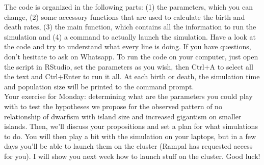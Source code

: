 \documentclass[12pt]{article}
\begin{document}
The code is organized in the following parts: (1) the parameters, which you can change, (2) some accessory functions that are used to calculate the birth and death rates, (3) the main function, which contains all the information to run the simulation and (4) a command to actually launch the simulation. Have a look at the code and try to understand what every line is doing. If you have questions, don't hesitate to ask on Whatsapp. To run the code on your computer, just open the script in RStudio, set the parameters as you wish, then Ctrl+A to select all the text and Ctrl+Enter to run it all. At each birth or death, the simulation time and population size will be printed to the command prompt.\\

Your exercise for Monday: determining what are the parameters you could play with to test the hypotheses we propose for the observed pattern of no relationship of dwarfism with island size and increased gigantism on smaller islands. Then, we'll discuss your propositions and set a plan for what simulations to do. You will then play a bit with the simulation on your laptops, but in a few days you'll be able to launch them on the cluster (Rampal has requested access for you). I will show you next week how to launch stuff on the cluster. Good luck!\\
\end{document}

